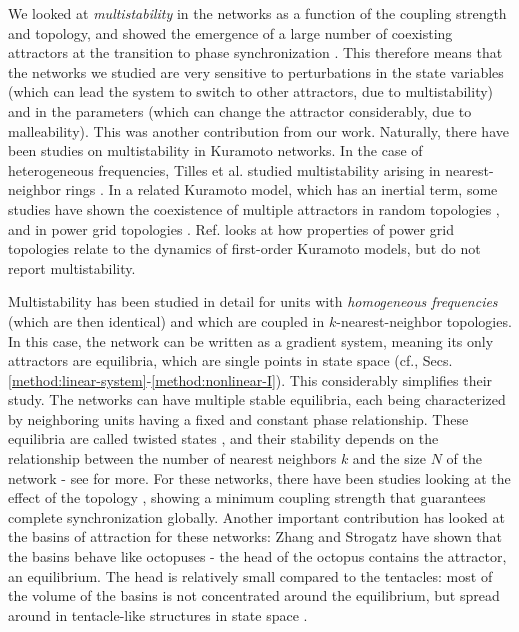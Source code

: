We looked at \textit{multistability} in the networks as a function of the coupling strength and topology, and showed the emergence of a large number of coexisting attractors at the transition to phase synchronization \cite{rossi2022shifts}. This therefore means that the networks we studied are very sensitive to perturbations in the state variables (which can lead the system to switch to other attractors, due to multistability) and in the parameters (which can change the attractor considerably, due to malleability). This was another contribution from our work. Naturally, there have been studies on multistability in Kuramoto networks. In the case of heterogeneous frequencies, Tilles et al. studied multistability arising in nearest-neighbor rings \cite{tilles2011multistable}. In a related Kuramoto model, which has an inertial term, some studies have shown the coexistence of multiple attractors in random topologies \cite{gelbrecht2020monte}, and in power grid topologies \cite{hellmann2020network, halekotte2021transient}. Ref. \cite{potratzki2024synchronization} looks at how properties of power grid topologies relate to the dynamics of first-order Kuramoto models, but do not report multistability.

Multistability has been studied in detail for units with \textit{homogeneous frequencies} (which are then identical) and which are coupled in $k$-nearest-neighbor topologies. In this case, the network can be written as a gradient system, meaning its only attractors are equilibria, which are single points in state space (cf., Secs. \ref{method:linear-system}-\ref{method:nonlinear-I}). This considerably simplifies their study. The networks can have multiple stable equilibria, each being characterized by neighboring units having a fixed and constant phase relationship. These equilibria are called twisted states \cite{wiley2006the}, and their stability depends on the relationship between the number of nearest neighbors $k$ and the size $N$ of the network \cite{wiley2006the} - see  for more. For these networks, there have been studies looking at the effect of the topology \cite{townsend2020dense}, showing a minimum coupling strength that guarantees complete synchronization globally. Another important contribution has looked at the basins of attraction for these networks: Zhang and Strogatz have shown that the basins behave like octopuses - the head of the octopus contains the attractor, an equilibrium. The head is relatively small compared to the tentacles: most of the volume of the basins is not concentrated around the equilibrium, but spread around in tentacle-like structures in state space \cite{zhang2021basins}. 

